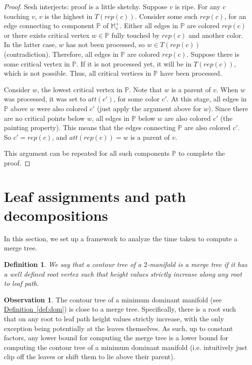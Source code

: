 \documentclass[11pt]{article}
\newtheorem{definition}[theorem]{Definition}
\theoremstyle{definition}
\newtheorem{observation}{Observation}
\newcommand{\MM}{\mathbb{M}}
\newcommand{\PP}{\mathbb{P}}
\newcommand{\Def}[1]{\hyperref[def:#1]{Definition~\ref*{def:#1}}} %
\newcommand{\Reminder}[1]{{\color{red}#1}}
\newcommand{\Sesh}[1]{\Reminder{Sesh interjects: #1}}
\newcommand{\h}{att}
\newcommand{\rep}{rep}
\begin{document}
\begin{proof} \Sesh{proof is a little sketchy.}
Suppose $v$ is ripe. For any $c$ touching $v$, $v$ is the highest in $T(\rep(c))$.
Consider some such $\rep(c)$, for an edge connecting to component $\PP$ of $\MM^+_v$.
Either all edges in $\PP$ are colored $\rep(c)$ or there exists critical vertex $w \in \PP$
fully touched by $\rep(c)$ and another color. In the latter case, $w$ has not been processed,
so $w \in T(\rep(c))$ (contradiction). Therefore, all edges in $\PP$ are colored $\rep(c)$.
Suppose there is some critical vertex in $\PP$. If it is not processed yet, it will
be in $T(\rep(c))$, which is not possible. Thus, all critical vertices in $\PP$ have been processed.

Consider $w$, the lowest critical vertex in $\PP$. Note that $w$ is a parent of $v$. When $w$ was processed, it was set to $\h(c')$, for
some color $c'$. At this stage, all edges in $\PP$ above $w$ were also colored $c'$ (just apply the argument
above for $w$). Since there are no critical points below $w$, all edges in $\PP$ below $w$
are also colored $c'$ (the painting property). This means that the edges connecting $\PP$
are also colored $c'$. So $c' = \rep(c)$, and $\h(\rep(c)) = w$ is a parent of $v$. 

This argument can be repeated for all such components $\PP$ to complete the proof.
\end{proof}


\newcommand{\pathTree}{P_{\mathcal{S}}}
\newcommand{\pathTreeA}{\mathcal{P}_{\mathcal{S}}}
\section{Leaf assignments and path decompositions}

In this section, we set up a framework to analyze the time taken to compute a merge tree.

\begin{definition}
 We say that a contour tree of a $2$-manifold is a \emph{merge tree} if it has a well defined root vertex such that height values 
 strictly increase along any root to leaf path.
\end{definition}

\begin{observation}
 The contour tree of a minimum dominant manifold (see \Def{dom}) is close to a merge tree.  Specifically, there is a root such that on any root 
 to leaf path height values strictly increase, with the only exception being potentially at the leaves themselves.  As such, up to constant 
 factors, any lower bound for computing the merge tree is a lower bound for computing the contour tree of a minimum dominant
 manifold (i.e. intuitively just clip off the leaves or shift them to lie above their parent).
\end{observation}
\end{document}
